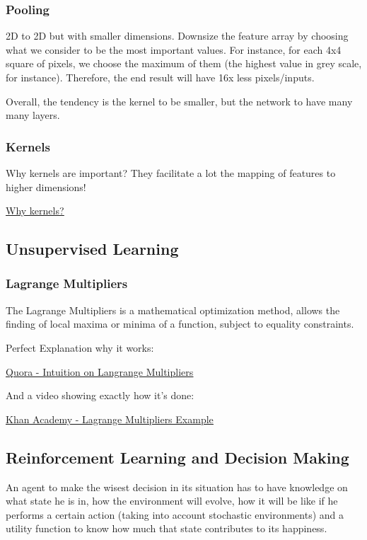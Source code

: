 



\subsubsection*{Pooling}
2D to 2D but with smaller dimensions.
Downsize the feature array by choosing what we consider to be the most important values. For instance, for each 4x4 square of pixels, we choose the maximum of them (the highest value in grey scale, for instance). Therefore, the end result will have 16x less pixels/inputs. 



Overall, the tendency is the kernel to be smaller, but the network to have many many layers.


\subsubsection{Kernels}
Why kernels are important? They facilitate a lot the mapping of features to higher dimensions!

\href{https://medium.com/@zxr.nju/what-is-the-kernel-trick-why-is-it-important-98a98db0961d}{\ul{Why kernels?}}



\subsection{Unsupervised Learning}

\subsubsection{Lagrange Multipliers}

The Lagrange Multipliers is a mathematical optimization method, allows the finding of local maxima or minima of a function, subject to equality constraints.

Perfect Explanation why it works:

\href{https://www.quora.com/Why-does-the-method-of-Lagrange-multipliers-work-for-optimization-in-multivariable-calculus-Why-exactly-given-a-function-f-x-y-and-a-constraint-g-x-y-c-can-we-set-the-gradients-of-the-functions-to-be-multiples-of-each-other}{\ul{Quora - Intuition on Langrange Multipliers}}

And a video showing exactly how it's done:

\href{https://www.youtube.com/watch?v=yuqB-d5MjZA}{\ul{Khan Academy - Lagrange Multipliers Example}}



\subsection{Reinforcement Learning and Decision Making}


An agent to make the wisest decision in its situation has to have knowledge on what state he is in, how the environment will evolve, how it will be like if he performs a certain action (taking into account stochastic environments) and a utility function to  know how much that state contributes to its happiness.


